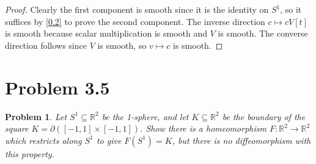\documentclass[11pt, letterpaper]{article}
\theoremstyle{plain}
\newtheorem{problem}{Problem}
\begin{document}
\begin{proof}
	Clearly the first component is smooth since it is the identity on $S^1$, so it suffices by \cref{0.2} to prove the second component. The inverse direction $c\mapsto cV[t]$ is smooth because scalar multiplication is smooth and $V$ is smooth. The converse direction follows since $V$ is smooth, so $v\mapsto c$ is smooth.
\end{proof}


\section{Problem 3.5}

\begin{problem}
	Let $S^1\subseteq \mathbb{R} ^2$ be the 1-sphere, and let $K\subseteq \mathbb{R} ^2$ be the boundary of the square $K=\partial ([-1,1]\times [-1,1])$. Show there is a homeomorphism $F : \mathbb{R} ^2 \to \mathbb{R} ^2$ which restricts along $S^1$ to give $F(S^1)=K$, but there is no \emph{diffeomorphism} with this property.
\end{problem}
\end{document}
